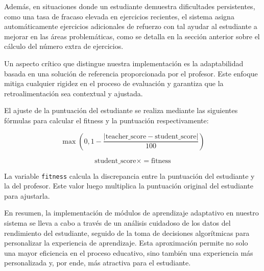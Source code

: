 Además, en situaciones donde un estudiante demuestra dificultades persistentes, como una tasa de fracaso elevada en ejercicios recientes, el sistema asigna automáticamente ejercicios adicionales de refuerzo con tal ayudar al estudiante a mejorar en las áreas problemáticas, como se detalla en la sección anterior sobre el cálculo del número extra de ejercicios.

Un aspecto crítico que distingue nuestra implementación es la adaptabilidad basada en una solución de referencia proporcionada por el profesor. Este enfoque mitiga cualquier rigidez en el proceso de evaluación y garantiza que la retroalimentación sea contextual y ajustada. 

El ajuste de la puntuación del estudiante se realiza mediante las siguientes fórmulas para calcular el fitness y la puntuación respectivamente:

\begin{equation}
\max\left(0, 1 - \frac{| \text{teacher\_score} - \text{student\_score} |}{100} \right)
\end{equation}

\begin{equation}
\text{student\_score} \times= \text{fitness}
\end{equation}

La variable \texttt{fitness} calcula la discrepancia entre la puntuación del estudiante y la del profesor. Este valor luego multiplica la puntuación original del estudiante para ajustarla. 

En resumen, la implementación de módulos de aprendizaje adaptativo en nuestro sistema se lleva a cabo a través de un análisis cuidadoso de los datos del rendimiento del estudiante, seguido de la toma de decisiones algorítmicas para personalizar la experiencia de aprendizaje. Esta aproximación permite no solo una mayor eficiencia en el proceso educativo, sino también una experiencia más personalizada y, por ende, más atractiva para el estudiante.
